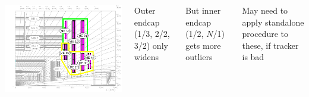 \documentclass[compress]{beamer}
\begin{document}
\begin{frame}
\begin{columns}
\mbox{\hspace{-0.5 cm}} \includegraphics[width=\linewidth]{outer_inner_endcap.pdf}

\vspace{0.2 cm}
Outer endcap (1/3, 2/2, 3/2) only widens

\vspace{0.2 cm}
But inner endcap (1/2, $N$/1) gets more outliers

\vspace{0.2 cm}
May need to apply standalone procedure to these, if tracker is bad

\end{columns}
\end{frame}
\end{document}
